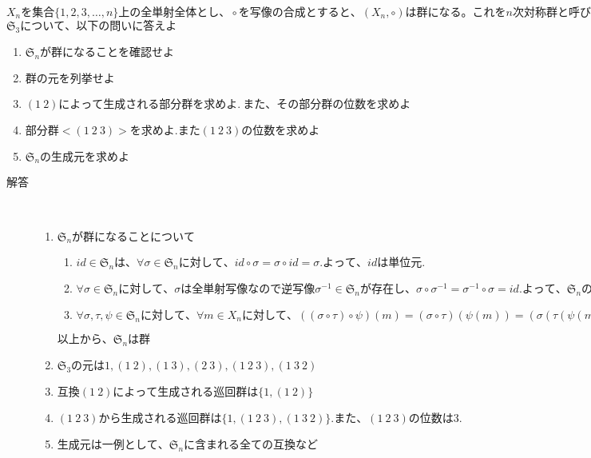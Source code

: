 \documentclass[dvipdfmx]{jsarticle}
\begin{document}
\begin{tcolorbox}[colframe=black!50,colback=white,colbacktitle=black!50,coltitle=white,fonttitle=\bfseries\sffamily,title=問題3.1]
$ X_n を集合 \{1,2,3, \dots , n\}上の全単射全体とし、\circ を写像の合成とすると、(X_n, \circ)は群になる。これをn次対称群と呼び\mathfrak{S}_nと書く.$\\
$\mathfrak{S}_3について、以下の問いに答えよ$
\begin{enumerate}
  \item $\mathfrak{S}_nが群になることを確認せよ$
  \item $群の元を列挙せよ$
  \item $(1 \ 2)によって生成される部分群を求めよ. \ また、その部分群の位数を求めよ$
  \item $部分群< (1 \ 2 \ 3) >を求めよ.また(1 \ 2 \ 3)の位数を求めよ$
  \item $\mathfrak{S}_nの生成元を求めよ$
\end{enumerate}
\end{tcolorbox}
\begin{description}
  \item[解答] \mbox{} \\
  \begin{enumerate}
    \item $\mathfrak{S}_nが群になることについて$
    \begin{enumerate}
      \item $ id \in \mathfrak{S}_nは、\forall \sigma \in \mathfrak{S}_n に対して、id \circ \sigma = \sigma \circ id = \sigma.よって、idは単位元.$
      \item $ \forall \sigma \in \mathfrak{S}_nに対して、\sigma は全単射写像なので逆写像 \sigma ^{-1} \in \mathfrak{S}_n が存在し、\sigma \circ \sigma ^{-1} = \sigma ^{-1} \circ \sigma = id. よって、\mathfrak{S}_nの任意の元に対して、逆元が存在する$
      \item $\forall \sigma , \tau , \psi \in \mathfrak{S}_nに対して、\forall m \in X_nに対して、((\sigma \circ \tau) \circ \psi)(m) = (\sigma \circ \tau)(\psi (m)) = (\sigma (\tau (\psi (m)))) = \sigma ((\tau \circ \psi)(m)) = (\sigma \circ (\tau \circ \psi))(m).よって、結合法則が成り立つ$
    \end{enumerate}
    $以上から、\mathfrak{S}_nは群$

    \item $\mathfrak{S}_3の元は 1, (1 \ 2), (1 \ 3), (2 \ 3),(1 \ 2 \ 3),(1 \ 3 \ 2)$

    \item $互換(1 \ 2)によって生成される巡回群は\{ 1 , (1 \ 2) \}$

    \item $(1 \ 2 \ 3)から生成される巡回群は \{ 1 , (1 \ 2 \ 3), (1 \ 3 \ 2) \}.また、(1 \ 2 \ 3)の位数は3.$

    \item $生成元は一例として、\mathfrak{S}_nに含まれる全ての互換など$

  \end{enumerate}

\end{description}
\end{document}
